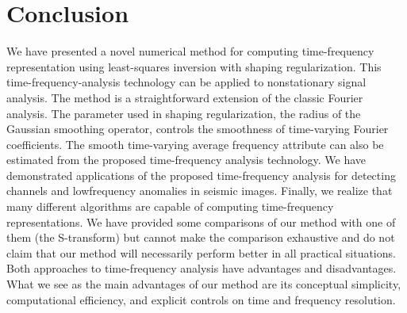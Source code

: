 






\section{Conclusion}

We have presented a novel numerical method for computing
time-frequency representation using least-squares inversion with
shaping regularization. This time-frequency-analysis technology
can be applied to nonstationary signal analysis. The method is a
straightforward extension of the classic Fourier analysis. The
parameter used in shaping regularization, the radius of the Gaussian
smoothing operator, controls the smoothness of time-varying
Fourier coefficients. The smooth time-varying average frequency
attribute can also be estimated from the proposed time-frequency
analysis technology. We have demonstrated applications of the
proposed time-frequency analysis for detecting channels and lowfrequency
anomalies in seismic images.
Finally, we realize that many different algorithms are capable of
computing time-frequency representations. We have provided some
comparisons of our method with one of them (the S-transform) but
cannot make the comparison exhaustive and do not claim that our
method will necessarily perform better in all practical situations.
Both approaches to time-frequency analysis have advantages and
disadvantages. What we see as the main advantages of our method
are its conceptual simplicity, computational efficiency, and explicit
controls on time and frequency resolution.

